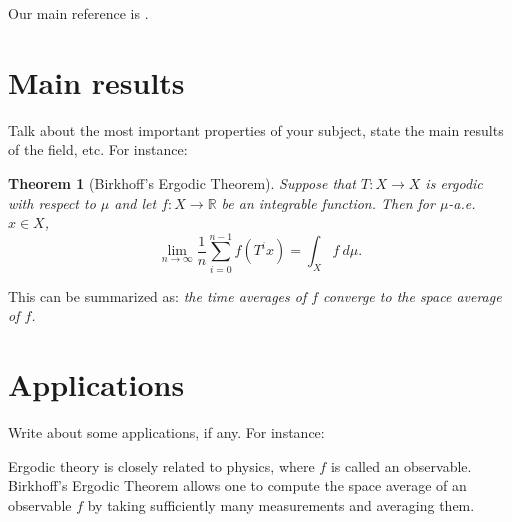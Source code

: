 \documentclass[12pt,letterpaper,reqno]{amsart}
\theoremstyle{plain}                              %
\newtheorem{thm}{Theorem}[section]
\theoremstyle{definition}                         %
\theoremstyle{remark}                             %
\numberwithin{equation}{section}
\newcommand{\R}{\mathbb{R}}                     %
\begin{document}
Our main reference is \cite{walters}.


\section{Main results}      \label{sec:properties}

Talk about the most important properties of your subject, state the
main results of the field, etc. For instance:

\begin{thm}[Birkhoff's Ergodic Theorem]
%
  Suppose that $T : X \to X$ is ergodic with respect to $\mu$ and let
  $f : X \to \R$ be an integrable function. Then for $\mu$-a.e. $x \in
  X$, 
%
  \begin{displaymath}
    \lim_{n \to \infty} \frac{1}{n} \sum_{i=0}^{n-1} f(T^ix) = \int_X f \: d\mu.
  \end{displaymath}
%
\end{thm}

This can be summarized as: \textit{the time averages of $f$ converge to the
space average of $f$.}
%  



\section{Applications}     \label{sec:applications}

Write about some applications, if any. For instance:

Ergodic theory is closely related to physics, where $f$ is called an
observable. Birkhoff's Ergodic Theorem allows one to compute the space
average of an observable $f$ by taking sufficiently many measurements
and averaging them.



 
    





\end{document}
